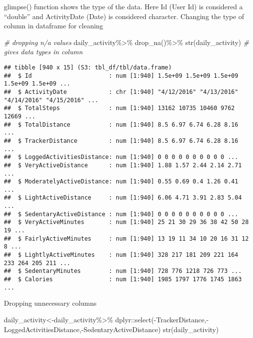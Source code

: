 \documentclass[
]{article}
\newenvironment{Shaded}{\begin{snugshade}}{\end{snugshade}}
\newcommand{\CommentTok}[1]{\textcolor[rgb]{0.56,0.35,0.01}{\textit{#1}}}
\newcommand{\FunctionTok}[1]{\textcolor[rgb]{0.00,0.00,0.00}{#1}}
\newcommand{\NormalTok}[1]{#1}
\newcommand{\OtherTok}[1]{\textcolor[rgb]{0.56,0.35,0.01}{#1}}
\newcommand{\SpecialCharTok}[1]{\textcolor[rgb]{0.00,0.00,0.00}{#1}}
\begin{document}
glimpse() function shows the type of the data. Here Id (User Id) is
considered a ``double'' and ActivityDate (Date) is considered character.
Changing the type of column in dataframe for cleaning

\begin{Shaded}
\begin{Highlighting}[]
\CommentTok{\# dropping n/a values }
\NormalTok{daily\_activity}\SpecialCharTok{\%\textgreater{}\%}
  \FunctionTok{drop\_na}\NormalTok{()}\SpecialCharTok{\%\textgreater{}\%}
 \FunctionTok{str}\NormalTok{(daily\_activity) }\CommentTok{\# gives data types in column}
\end{Highlighting}
\end{Shaded}

\begin{verbatim}
## tibble [940 x 15] (S3: tbl_df/tbl/data.frame)
##  $ Id                      : num [1:940] 1.5e+09 1.5e+09 1.5e+09 1.5e+09 1.5e+09 ...
##  $ ActivityDate            : chr [1:940] "4/12/2016" "4/13/2016" "4/14/2016" "4/15/2016" ...
##  $ TotalSteps              : num [1:940] 13162 10735 10460 9762 12669 ...
##  $ TotalDistance           : num [1:940] 8.5 6.97 6.74 6.28 8.16 ...
##  $ TrackerDistance         : num [1:940] 8.5 6.97 6.74 6.28 8.16 ...
##  $ LoggedActivitiesDistance: num [1:940] 0 0 0 0 0 0 0 0 0 0 ...
##  $ VeryActiveDistance      : num [1:940] 1.88 1.57 2.44 2.14 2.71 ...
##  $ ModeratelyActiveDistance: num [1:940] 0.55 0.69 0.4 1.26 0.41 ...
##  $ LightActiveDistance     : num [1:940] 6.06 4.71 3.91 2.83 5.04 ...
##  $ SedentaryActiveDistance : num [1:940] 0 0 0 0 0 0 0 0 0 0 ...
##  $ VeryActiveMinutes       : num [1:940] 25 21 30 29 36 38 42 50 28 19 ...
##  $ FairlyActiveMinutes     : num [1:940] 13 19 11 34 10 20 16 31 12 8 ...
##  $ LightlyActiveMinutes    : num [1:940] 328 217 181 209 221 164 233 264 205 211 ...
##  $ SedentaryMinutes        : num [1:940] 728 776 1218 726 773 ...
##  $ Calories                : num [1:940] 1985 1797 1776 1745 1863 ...
\end{verbatim}

Dropping unnecessary columns

\begin{Shaded}
\begin{Highlighting}[]
\NormalTok{daily\_activity}\OtherTok{\textless{}{-}}\NormalTok{daily\_activity}\SpecialCharTok{\%\textgreater{}\%}
\NormalTok{  dplyr}\SpecialCharTok{::}\FunctionTok{select}\NormalTok{(}\SpecialCharTok{{-}}\NormalTok{TrackerDistance,}\SpecialCharTok{{-}}\NormalTok{LoggedActivitiesDistance,}\SpecialCharTok{{-}}\NormalTok{SedentaryActiveDistance)}
\FunctionTok{str}\NormalTok{(daily\_activity)}
\end{Highlighting}
\end{Shaded}
\end{document}
